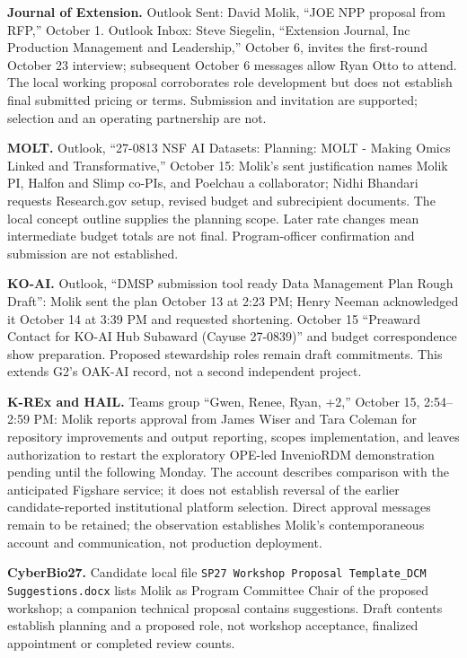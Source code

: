 \textbf{Journal of Extension.} Outlook Sent: David Molik, ``JOE NPP proposal
from RFP,'' October 1. Outlook Inbox: Steve Siegelin, ``Extension Journal, Inc
Production Management and Leadership,'' October 6, invites the first-round
October 23 interview; subsequent October 6 messages allow Ryan Otto to attend.
The local working proposal corroborates role development but does not establish
final submitted pricing or terms. Submission and invitation are supported;
selection and an operating partnership are not.

\textbf{MOLT.} Outlook, ``27-0813 NSF AI Datasets: Planning: MOLT - Making
Omics Linked and Transformative,'' October 15: Molik's sent justification names
Molik PI, Halfon and Slimp co-PIs, and Poelchau a collaborator; Nidhi Bhandari
requests Research.gov setup, revised budget and subrecipient documents.
The local concept outline supplies the planning scope. Later rate changes
mean intermediate budget totals are not final. Program-officer confirmation
and submission are not established.

\textbf{KO-AI.} Outlook, ``DMSP submission tool ready Data Management Plan
Rough Draft'': Molik sent the plan October 13 at 2:23 PM; Henry Neeman
acknowledged it October 14 at 3:39 PM and requested shortening. October 15
``Preaward Contact for KO-AI Hub Subaward (Cayuse 27-0839)'' and budget
correspondence show preparation. Proposed stewardship roles remain draft
commitments. This extends G2's OAK-AI record, not a second independent project.

\textbf{K-REx and HAIL.} Teams group ``Gwen, Renee, Ryan, +2,'' October 15,
2:54--2:59 PM: Molik reports approval from James Wiser and Tara Coleman for
repository improvements and output reporting, scopes implementation, and leaves
authorization to restart the exploratory OPE-led InvenioRDM demonstration
pending until the following Monday. The account describes comparison with the
anticipated Figshare service; it does not establish reversal of the earlier
candidate-reported institutional platform selection. Direct approval messages
remain to be retained; the observation establishes Molik's contemporaneous
account and communication, not production deployment.

\textbf{CyberBio27.} Candidate local file
\texttt{SP27 Workshop Proposal Template\_DCM Suggestions.docx} lists Molik as
Program Committee Chair of the proposed workshop; a companion technical proposal
contains suggestions. Draft contents establish planning and a proposed role,
not workshop acceptance, finalized appointment or completed review counts.

